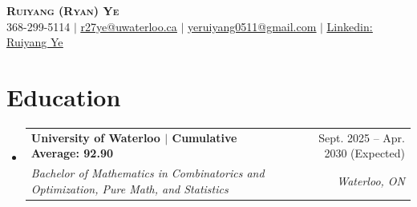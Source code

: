 \documentclass[letterpaper,11pt]{article}
\makeatletter
\newcommand{\resumeSubheading}[4]{
  \vspace{-2pt}\item
    \begin{tabular*}{0.97\textwidth}[t]{l@{\extracolsep{\fill}}r}
      \textbf{#1} & #2 \\
      \textit{\small#3} & \textit{\small #4} \\
    \end{tabular*}\vspace{-7pt}
}
\newcommand{\resumeSubHeadingListStart}{\begin{itemize}[leftmargin=0.15in, label={}]}
\newcommand{\resumeSubHeadingListEnd}{\end{itemize}}
\makeatother
\begin{document}
\begin{center}
    \textbf{\Huge \scshape Ruiyang (Ryan) Ye} \\ \vspace{1pt}
    \small 368-299-5114 $|$ \href{mailto:r27ye@uwaterloo.ca}{\underline{r27ye@uwaterloo.ca}} $|$ \href{mailto:yeruiyang0511@gmail.com}{\underline{yeruiyang0511@gmail.com}} $|$ 
    \href{https://www.linkedin.com/in/ruiyang-ye-992b66298/}{\underline{Linkedin: Ruiyang Ye}}
\end{center}

\section{Education}
  \resumeSubHeadingListStart
    \resumeSubheading
      {University of Waterloo $|$ Cumulative Average: 92.90}{Sept. 2025 -- Apr. 2030 (Expected)}
      {\footnotesize Bachelor of Mathematics in Combinatorics and Optimization, Pure Math, and Statistics}{Waterloo, ON}
  \resumeSubHeadingListEnd

\end{document}
